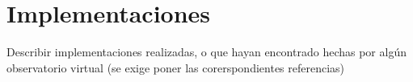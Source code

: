 \section{Implementaciones}
Describir implementaciones realizadas, o que hayan encontrado hechas por algún observatorio virtual (se exige poner las corerspondientes
referencias)
